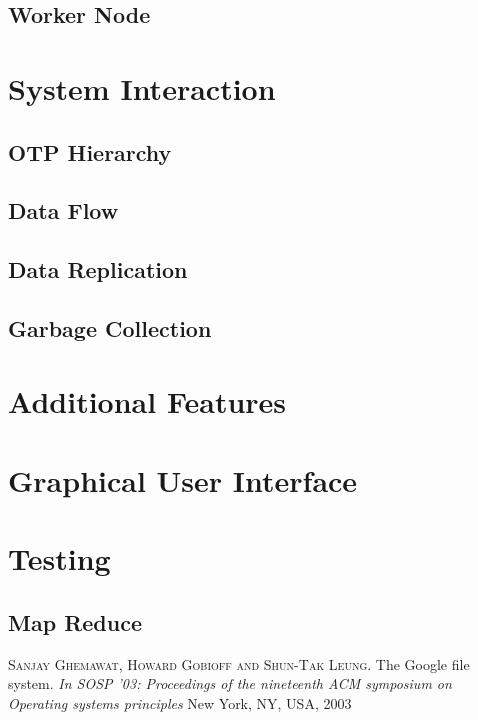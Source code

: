 \documentclass[a4paper,12pt]{article}
\begin{document}
\subsection{Worker Node}

\section{System Interaction}
\subsection{OTP Hierarchy}
\subsection{Data Flow}
\subsection{Data Replication}
\subsection{Garbage Collection}

\section{Additional Features}

\section{Graphical User Interface}

\section{Testing}
\subsection{Map Reduce}

\begin{thebibliography}{9}
  \textsc{Sanjay Ghemawat, Howard Gobioff and Shun-Tak Leung}.
  The Google file system.
  \emph{In SOSP '03: Proceedings of the nineteenth ACM symposium on Operating systems principles}
  New York, NY, USA, 2003
\end{thebibliography}
\end{document}
